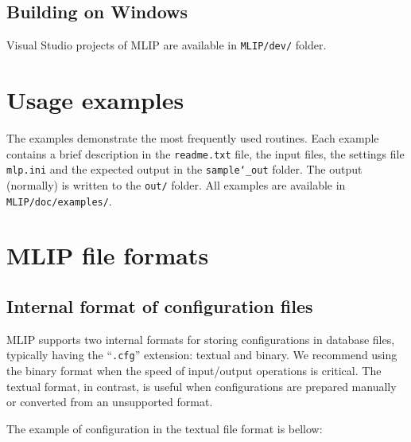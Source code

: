 \documentclass[12pt]{article}
\renewcommand{\_}{\char`_}
\begin{document}
\subsection{Building on Windows}

Visual Studio projects of MLIP are available in \texttt{MLIP/dev/} folder.


\section{Usage examples} \label{Using}

The examples demonstrate the most frequently used routines. Each example contains a brief description in the \texttt{readme.txt} file, the input files, the settings file \texttt{mlp.ini} and the expected output in the \texttt{sample\_out} folder.
The output (normally) is written to the \texttt{out/} folder.
All examples are available in \texttt{MLIP/doc/examples/}.

\section{MLIP file formats}

\subsection{Internal format of configuration files}\label{cfg-file}

MLIP supports two internal formats for storing configurations in database files, typically having the ``\texttt{.cfg}'' extension: textual and binary.
We recommend using the binary format when the speed of input/output operations is critical.
The textual format, in contrast, is useful when configurations are prepared manually or converted from an unsupported format.

The example of configuration in the textual file format is bellow:
\end{document}
